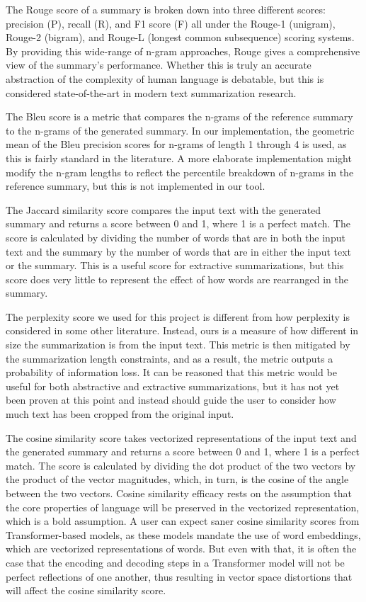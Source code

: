 The Rouge score of a summary is broken down into three different scores: precision (P), recall (R), and F1 score (F) all under the Rouge-1 (unigram), Rouge-2 (bigram), and Rouge-L (longest common subsequence) scoring systems.
By providing this wide-range of n-gram approaches, Rouge gives a comprehensive view of the summary's performance.
Whether this is truly an accurate abstraction of the complexity of human language is debatable, but this is considered state-of-the-art in modern text summarization research.

The Bleu score is a metric that compares the n-grams of the reference summary to the n-grams of the generated summary.
In our implementation, the geometric mean of the Bleu precision scores for n-grams of length 1 through 4 is used, as this is fairly standard in the literature.
A more elaborate implementation might modify the n-gram lengths to reflect the percentile breakdown of n-grams in the reference summary, but this is not implemented in our tool.

The Jaccard similarity score compares the input text with the generated summary and returns a score between 0 and 1, where 1 is a perfect match.
The score is calculated by dividing the number of words that are in both the input text and the summary by the number of words that are in either the input text or the summary.
This is a useful score for extractive summarizations, but this score does very little to represent the effect of how words are rearranged in the summary.

The perplexity score we used for this project is different from how perplexity is considered in some other literature.
Instead, ours is a measure of how different in size the summarization is from the input text.
This metric is then mitigated by the summarization length constraints, and as a result, the metric outputs a probability of information loss.
It can be reasoned that this metric would be useful for both abstractive and extractive summarizations, but it has not yet been proven at this point and instead should guide the user to consider how much text has been cropped from the original input.

The cosine similarity score takes vectorized representations of the input text and the generated summary and returns a score between 0 and 1, where 1 is a perfect match.
The score is calculated by dividing the dot product of the two vectors by the product of the vector magnitudes, which, in turn, is the cosine of the angle between the two vectors.
Cosine similarity efficacy rests on the assumption that the core properties of language will be preserved in the vectorized representation, which is a bold assumption.
A user can expect saner cosine similarity scores from Transformer-based models, as these models mandate the use of word embeddings, which are vectorized representations of words.
But even with that, it is often the case that the encoding and decoding steps in a Transformer model will not be perfect reflections of one another, thus resulting in vector space distortions that will affect the cosine similarity score.

